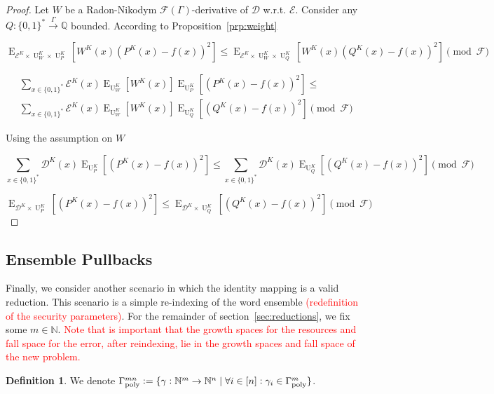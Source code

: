 \documentclass[11pt]{article}
\numberwithin{equation}{section}
\theoremstyle{definition}
\newtheorem{definition}{Definition}[section]
\theoremstyle{plain}
\newcommand{\Bool}{\{0,1\}}
\newcommand{\Words}{{\Bool^*}}
\DeclareMathOperator{\E}{E}
\DeclareMathOperator{\Un}{U}
\newcommand{\Nats}{\mathbb{N}}
\newcommand{\Rats}{\mathbb{Q}}
\newcommand{\Dist}{\mathcal{D}}
\newcommand{\Fall}{\mathcal{F}}
\newcommand{\EG}{\Fall(\Gamma)}
\newcommand{\GammaPoly}{\Gamma_{\textnormal{poly}}}
\newcommand{\Scheme}{\xrightarrow{\Gamma}}
\begin{document}
\begin{proof}

Let ${W}$ be a Radon-Nikodym ${\EG}$-derivative of ${\Dist}$ w.r.t. ${\mathcal{E}}$. Consider any ${Q: \Words \Scheme \Rats}$ bounded. According to Proposition~\ref{prp:weight}

\[\E_{\mathcal{E}^{K} \times \Un_W^K \times \Un_P^K}[W^K(x)(P^K(x)-f(x))^2] \leq \E_{\mathcal{E}^{K} \times \Un_W^K \times \Un_Q^K}[W^K(x)(Q^K(x)-f(x))^2] \pmod \Fall\]

\begin{align*}
&\sum_{x \in \Words} \mathcal{E}^{K}(x) \E_{\Un_W^K}[W^K(x)] \E_{\Un_P^K}[(P^K(x)-f(x))^2] \leq\\
&\sum_{x \in \Words} \mathcal{E}^{K}(x) \E_{\Un_W^K}[W^K(x)] \E_{\Un_Q^K}[(Q^K(x)-f(x))^2] \pmod \Fall
\end{align*}

Using the assumption on ${W}$

\[\sum_{x \in \Words} \Dist^{K}(x) \E_{\Un_P^K}[(P^K(x)-f(x))^2] \leq \sum_{x \in \Words} \Dist^{K}(x) \E_{\Un_Q^K}[(Q^K(x)-f(x))^2] \pmod \Fall\]

\[\E_{\Dist^{K} \times \Un_P^K}[(P^K(x)-f(x))^2] \leq \E_{\Dist^{K} \times \Un_Q^K}[(Q^K(x)-f(x))^2] \pmod \Fall\]
%
\end{proof}

\subsection{Ensemble Pullbacks}

Finally, we consider another scenario in which the identity mapping is a valid reduction. This scenario is a simple re-indexing of the word ensemble \textcolor{red}{(redefinition of the security parameters)}. For the remainder of section~\ref{sec:reductions}, we fix some ${m \in \Nats}$. \textcolor{red}{Note that is important that the growth spaces for the resources and fall space for the error, after reindexing, lie in the growth spaces and fall space of the new problem.}

\begin{samepage}
\begin{definition}

We denote ${\GammaPoly^{mn}:=\{\gamma: \Nats^m \rightarrow \Nats^n \mid \forall i \in [n]: \gamma_i \in \GammaPoly^m \}}$.

\end{definition}
\end{samepage}
\end{document}
